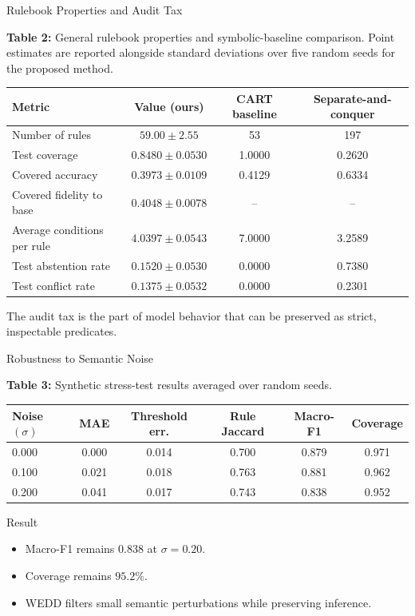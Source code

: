 \documentclass[aspectratio=169,xcolor=dvipsnames]{beamer}
\newcommand{\compactitem}{\setlength{\itemsep}{0.35em}}
\begin{document}
\begin{frame}{Rulebook Properties and Audit Tax}
\small
{\scriptsize \textbf{Table 2:} General rulebook properties and symbolic-baseline comparison. Point estimates are reported alongside standard deviations over five random seeds for the proposed method.\par}
\vspace{0.15em}
\scriptsize
\begin{tabularx}{\linewidth}{Yccc}
\toprule
\textbf{Metric} & \textbf{Value (ours)} & \textbf{CART baseline} & \textbf{Separate-and-conquer}\\
\midrule
Number of rules & \(59.00\pm2.55\) & 53 & 197\\
Test coverage & \(0.8480\pm0.0530\) & 1.0000 & 0.2620\\
Covered accuracy & \(0.3973\pm0.0109\) & 0.4129 & 0.6334\\
Covered fidelity to base & \(0.4048\pm0.0078\) & -- & --\\
Average conditions per rule & \(4.0397\pm0.0543\) & 7.0000 & 3.2589\\
Test abstention rate & \(0.1520\pm0.0530\) & 0.0000 & 0.7380\\
Test conflict rate & \(0.1375\pm0.0532\) & 0.0000 & 0.2301\\
\bottomrule
\end{tabularx}
\vspace{0.25em}
{\scriptsize The audit tax is the part of model behavior that can be preserved as strict, inspectable predicates.\par}
\end{frame}

\begin{frame}{Robustness to Semantic Noise}
\small
{\scriptsize \textbf{Table 3:} Synthetic stress-test results averaged over random seeds.\par}
\vspace{0.15em}
\scriptsize
\begin{tabularx}{\linewidth}{lccccc}
\toprule
\textbf{Noise \((\sigma)\)} & \textbf{MAE} & \textbf{Threshold err.} & \textbf{Rule Jaccard} & \textbf{Macro-F1} & \textbf{Coverage}\\
\midrule
0.000 & 0.000 & 0.014 & 0.700 & 0.879 & 0.971\\
0.100 & 0.021 & 0.018 & 0.763 & 0.881 & 0.962\\
0.200 & 0.041 & 0.017 & 0.743 & 0.838 & 0.952\\
\bottomrule
\end{tabularx}
\vspace{0.45em}
\begin{exampleblock}{Result}
\small
\begin{itemize}\compactitem
  \item Macro-F1 remains \(0.838\) at \(\sigma=0.20\).
  \item Coverage remains \(95.2\%\).
  \item WEDD filters small semantic perturbations while preserving inference.
\end{itemize}
\end{exampleblock}
\end{frame}
\end{document}
